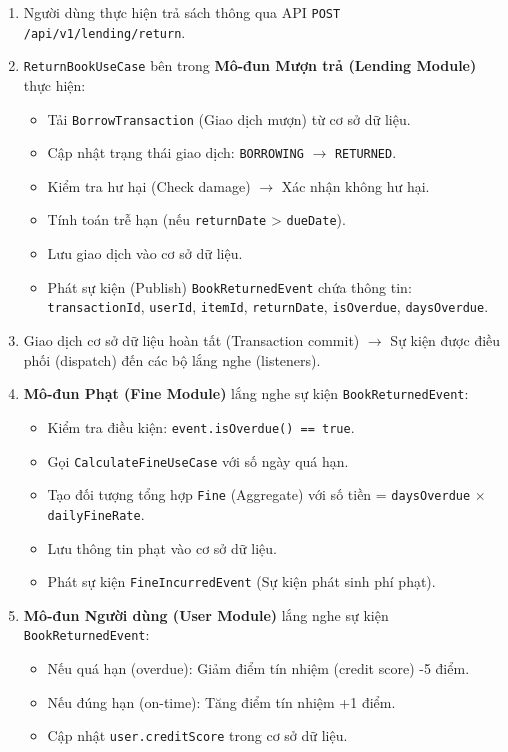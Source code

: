 \begin{enumerate}
    \item Người dùng thực hiện trả sách thông qua API \texttt{POST /api/v1/lending/return}.
    
    \item \texttt{ReturnBookUseCase} bên trong \textbf{Mô-đun Mượn trả (Lending Module)} thực hiện:
    \begin{itemize}
        \item Tải \texttt{BorrowTransaction} (Giao dịch mượn) từ cơ sở dữ liệu.
        \item Cập nhật trạng thái giao dịch: \texttt{BORROWING} $\rightarrow$ \texttt{RETURNED}.
        \item Kiểm tra hư hại (Check damage) $\rightarrow$ Xác nhận không hư hại.
        \item Tính toán trễ hạn (nếu \texttt{returnDate} > \texttt{dueDate}).
        \item Lưu giao dịch vào cơ sở dữ liệu.
        \item Phát sự kiện (Publish) \texttt{BookReturnedEvent} chứa thông tin: \texttt{transactionId}, \texttt{userId}, \texttt{itemId}, \texttt{returnDate}, \texttt{isOverdue}, \texttt{daysOverdue}.
    \end{itemize}
    
    \item Giao dịch cơ sở dữ liệu hoàn tất (Transaction commit) $\rightarrow$ Sự kiện được điều phối (dispatch) đến các bộ lắng nghe (listeners).
    
    \item \textbf{Mô-đun Phạt (Fine Module)} lắng nghe sự kiện \texttt{BookReturnedEvent}:
    \begin{itemize}
        \item Kiểm tra điều kiện: \texttt{event.isOverdue() == true}.
        \item Gọi \texttt{CalculateFineUseCase} với số ngày quá hạn.
        \item Tạo đối tượng tổng hợp \texttt{Fine} (Aggregate) với số tiền = \texttt{daysOverdue} $\times$ \texttt{dailyFineRate}.
        \item Lưu thông tin phạt vào cơ sở dữ liệu.
        \item Phát sự kiện \texttt{FineIncurredEvent} (Sự kiện phát sinh phí phạt).
    \end{itemize}
    
    \item \textbf{Mô-đun Người dùng (User Module)} lắng nghe sự kiện \texttt{BookReturnedEvent}:
    \begin{itemize}
        \item Nếu quá hạn (overdue): Giảm điểm tín nhiệm (credit score) -5 điểm.
        \item Nếu đúng hạn (on-time): Tăng điểm tín nhiệm +1 điểm.
        \item Cập nhật \texttt{user.creditScore} trong cơ sở dữ liệu.
    \end{itemize}
    

\end{enumerate}
